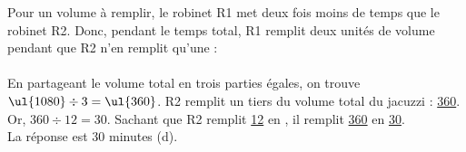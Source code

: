    Pour un volume à remplir, le robinet R1 met deux fois moins de temps que le robinet R2. Donc, pendant le temps total, R1 remplit deux \og unités de volume \fg{} pendant que R2 n'en remplit qu’une : \\ [1mm]
    \\
   En partageant le volume total en trois parties égales, on trouve $\ul{1080}\div3 =\ul{360}$.
   R2 remplit un tiers du volume total du jacuzzi : \ul{360}. \\
   Or, $360\div12 =30$. Sachant que R2 remplit \ul{12} en , il remplit \ul{360} en \ul{30}. \\
   {\blue La réponse est 30 minutes (d)}. \bigskip
